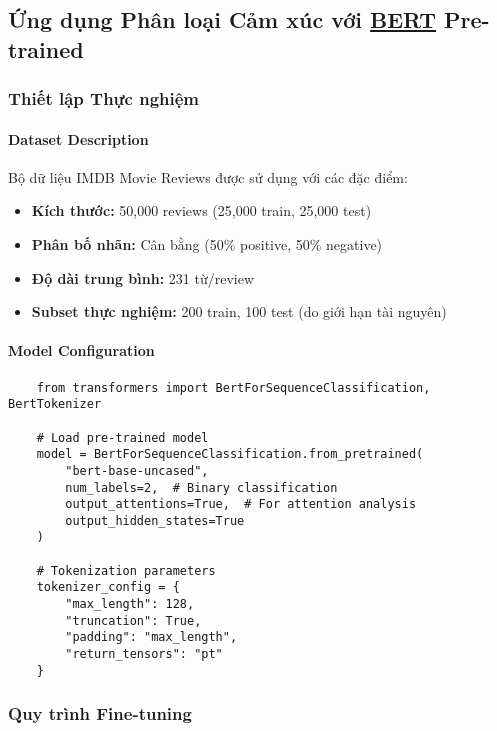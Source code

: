     \subsection{Ứng dụng Phân loại Cảm xúc với \hyperref[acro:bert]{\textbf{BERT}} Pre-trained}
    \label{ssec:phan_loai_cam_xuc}
    
    \subsubsection{Thiết lập Thực nghiệm}
    
    \paragraph{Dataset Description}
    Bộ dữ liệu IMDB Movie Reviews \cite{maas2011learning} được sử dụng với các đặc điểm:
    \begin{itemize}
        \item \textbf{Kích thước:} 50,000 reviews (25,000 train, 25,000 test)
        \item \textbf{Phân bố nhãn:} Cân bằng (50\% positive, 50\% negative)  
        \item \textbf{Độ dài trung bình:} 231 từ/review
        \item \textbf{Subset thực nghiệm:} 200 train, 100 test (do giới hạn tài nguyên)
    \end{itemize}
    
    \paragraph{Model Configuration}
    \begin{verbatim}
    from transformers import BertForSequenceClassification, BertTokenizer
    
    # Load pre-trained model
    model = BertForSequenceClassification.from_pretrained(
        "bert-base-uncased",
        num_labels=2,  # Binary classification
        output_attentions=True,  # For attention analysis
        output_hidden_states=True
    )
    
    # Tokenization parameters
    tokenizer_config = {
        "max_length": 128,
        "truncation": True,
        "padding": "max_length",
        "return_tensors": "pt"
    }
    \end{verbatim}
    
    \subsubsection{Quy trình Fine-tuning}
    
